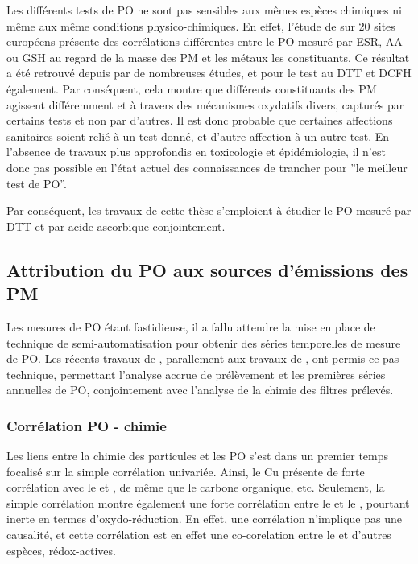 Les différents tests de PO ne sont pas sensibles aux mêmes espèces chimiques ni même aux même
conditions physico-chimiques. En effet, l'étude de \textcite{kunzliComparison2006} sur 20
sites européens présente des corrélations différentes entre le PO mesuré par ESR, AA ou
GSH au regard de la masse des PM et les métaux les constituants.
Ce résultat a été retrouvé depuis par de nombreuses études, et pour le test au DTT et DCFH
également. Par conséquent, cela montre que différents constituants des PM agissent
différemment et à travers des mécanismes oxydatifs divers, capturés par certains tests et
non par d'autres.
Il est donc probable que certaines affections sanitaires soient relié à un test donné, et
d'autre affection à un autre test. En l'absence de travaux plus approfondis en toxicologie
et épidémiologie, il n'est donc pas possible en l'état actuel des connaissances de trancher
pour ''le meilleur test de PO''.

Par conséquent, les travaux de cette thèse s'emploient à étudier le PO mesuré par DTT et
par acide ascorbique conjointement.


\subsection{Attribution du PO aux sources d'émissions des PM}%
\label{sub:attribution_du_po_aux_sources_d_émissions_des_pm}

Les mesures de PO étant fastidieuse, il a fallu attendre la mise en place de technique
de semi-automatisation pour obtenir des séries temporelles de mesure de PO. Les récents
travaux de \textcite{fangSemiautomated2015}, parallement aux travaux de
\textcite{calasPollution2017}, ont permis ce pas technique, permettant l'analyse accrue de
prélèvement et les premières séries annuelles de PO, conjointement avec l'analyse de la
chimie des filtres prélevés.

\subsubsection{Corrélation PO - chimie}%
\label{ssub:corrélation_po_chimie}

Les liens entre la chimie des particules et les PO s'est dans un premier temps focalisé
sur la simple corrélation univariée. Ainsi, le Cu présente de forte corrélation
avec le \PODTT{} et \POAA, de même que le carbone organique, etc. Seulement, la simple
corrélation montre également une forte corrélation entre le \PODTT{} et le ,
pourtant inerte en termes d'oxydo-réduction.
En effet, une corrélation n'implique pas une causalité, et cette corrélation est en effet
une co-corelation entre le  et d'autres espèces, rédox-actives.


